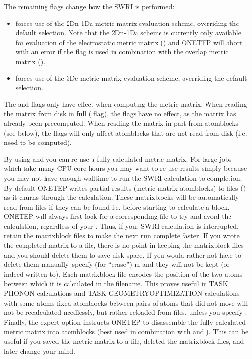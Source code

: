\documentclass[letterpaper,10pt,english]{sphinxmanual}
\begin{document}
The remaining flags change how the SWRI is performed:
\begin{itemize}
\item {} 
 \textendash{} forces use of the 2Dn-1Da metric matrix evaluation scheme,
overriding the default selection. Note that the 2Dn-1Da scheme is
currently only available for evaluation of the electrostatic metric
matrix () and ONETEP will abort with an error if the  flag
is used in combination with the overlap metric matrix ().

\item {} 
 \textendash{} forces use of the 3Dc metric matrix evaluation scheme,
overriding the default selection.

\end{itemize}

The  and  flags only have effect when computing the metric
matrix. When reading the matrix from disk in full ( flag), the
flags have no effect, as the matrix has already been precomputed. When
reading the matrix in part from atomblocks (see below), the flags will
only affect atomblocks that are not read from disk (i.e. need to be
computed).

By using  and  you can re-use a fully calculated metric
matrix. For large jobs which take many CPU-core-hours you may want to
re-use  results simply because you may not have enough walltime
to run the SWRI calculation to completion. By default ONETEP writes
partial results (metric matrix atomblocks) to files
() as it churns through the calculation. These
matrixblocks will be automatically read from files if they can be found
\textendash{} i.e. before starting to calculate a block, ONETEP will always first
look for a corresponding file to try and avoid the calculation,
regardless of your . Thus, if your SWRI calculation is
interrupted, retain the matrixblock files to make the next run complete
faster. If you wrote the completed matrix to a file, there is no point
in keeping the matrixblock files and you should delete them to save disk
space. If you would rather not have to delete them manually, specify
 (for “erase”) in  and they will not be kept (or indeed
written to). Each matrixblock file encodes the position of the two atoms
between which it is calculated in the filename. This proves useful in
TASK PHONON calculations and TASK GEOMETRYOPTIMIZATION calculations with
some atoms fixed \textendash{} atomblocks between pairs of atoms that did not move
will not be recalculated needlessly, but rather reloaded from files,
unless you specify . Finally, the expert option  instructs
ONETEP to disassemble the fully calculated metric matrix into atomblocks
(best used in combination with  and ). This can be useful if
you saved the metric matrix to a file, deleted the matrixblock files,
and later change your mind.
\end{document}
